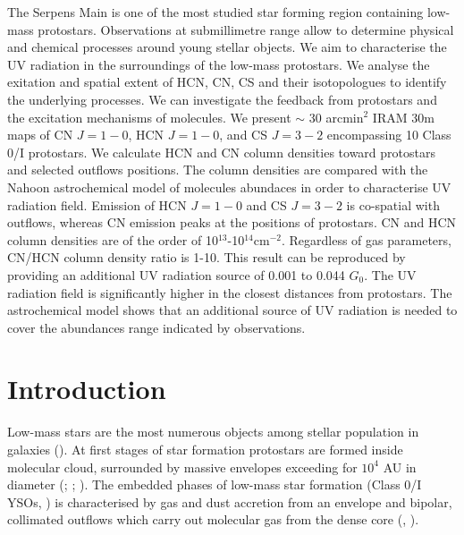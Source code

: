 \documentclass{aa}
\begin{document}
  \abstract
   {The Serpens Main is one of the most studied star forming region containing low-mass protostars. Observations at submillimetre range allow to determine physical and chemical processes around young stellar objects.} %
   {We aim to characterise the UV radiation in the surroundings of the low-mass protostars. We analyse the exitation and spatial extent of HCN, CN, CS and their isotopologues to identify the underlying processes. We can investigate the feedback from protostars and the excitation mechanisms of molecules. }
   {We present $ \sim $ 30 arcmin$^2$ IRAM 30m maps of CN $J=1-0$, HCN $J=1-0$, and CS $J=3-2$ encompassing 10 Class 0/I protostars. We calculate HCN and CN column densities toward protostars and selected outflows positions. The column densities are compared with the Nahoon astrochemical model of molecules abundaces in order to characterise UV radiation field.}
   {Emission of HCN $J=1-0$ and CS $J=3-2$ is co-spatial with outflows, whereas CN emission peaks at the positions of protostars. CN and HCN column densities are of the order of 10$^{13}$-10$^{14}$cm$^{-2}$. Regardless of gas parameters, CN/HCN column density ratio is 1-10. This result can be reproduced by providing an additional UV radiation source of 0.001 to 0.044 $G_0$.}
   {The UV radiation field is significantly higher in the closest distances from protostars. The astrochemical model shows that an additional source of UV radiation is needed to cover the abundances range indicated by observations.}


   \maketitle
%

\section{Introduction}
Low-mass stars are the most numerous objects among stellar population in galaxies (\citealt{Kro02}). At first stages of star formation protostars are formed inside molecular cloud, surrounded by massive envelopes exceeding for $10^4$ AU in diameter (\citealt{Lad87}; \citealt{Lar03}; \citealt{Ber07}). The embedded phases of low-mass star formation (Class 0/I YSOs, \citealt{And93}) is characterised by gas and dust accretion from an envelope and bipolar, collimated outflows which carry out molecular gas from the dense core (\citealt{Zuc76}, \citealt{Arc06}). 
\end{document}
